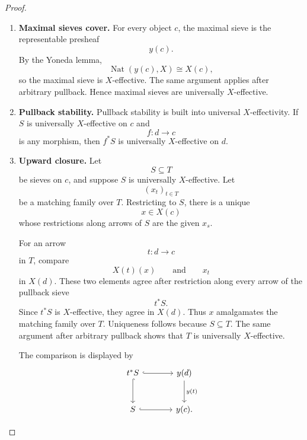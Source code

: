 \begin{proof}
    \leavevmode
    \begin{enumerate}
        \item \textbf{Maximal sieves cover.}
        For every object \(c\), the maximal sieve is the representable
        presheaf
        \[
            y(c).
        \]
        By the Yoneda lemma,
        \[
            \operatorname{Nat}(y(c),X)\cong X(c),
        \]
        so the maximal sieve is \(X\)-effective. The same argument applies
        after arbitrary pullback. Hence maximal sieves are universally
        \(X\)-effective.

        \item \textbf{Pullback stability.}
        Pullback stability is built into universal \(X\)-effectivity. If \(S\)
        is universally \(X\)-effective on \(c\) and
        \[
            f:d\to c
        \]
        is any morphism, then \(f^*S\) is universally \(X\)-effective on \(d\).

        \item \textbf{Upward closure.}
        Let
        \[
            S\subseteq T
        \]
        be sieves on \(c\), and suppose \(S\) is universally \(X\)-effective.
        Let
        \[
            (x_t)_{t\in T}
        \]
        be a matching family over \(T\). Restricting to \(S\), there is a
        unique
        \[
            x\in X(c)
        \]
        whose restrictions along arrows of \(S\) are the given \(x_s\).

        For an arrow
        \[
            t:d\to c
        \]
        in \(T\), compare
        \[
            X(t)(x)
            \qquad\text{and}\qquad
            x_t
        \]
        in \(X(d)\). These two elements agree after restriction along every
        arrow of the pullback sieve
        \[
            t^*S.
        \]
        Since \(t^*S\) is \(X\)-effective, they agree in \(X(d)\). Thus \(x\)
        amalgamates the matching family over \(T\). Uniqueness follows because
        \(S\subseteq T\). The same argument after arbitrary pullback shows that
        \(T\) is universally \(X\)-effective.

        The comparison is displayed by
        \[
        \begin{tikzcd}[column sep=large, row sep=large]
            t^*S
                \arrow[r, hook]
                \arrow[d, hook]
            &
            y(d)
                \arrow[d, "y(t)"]
            \\
            S
                \arrow[r, hook]
            &
            y(c).
        \end{tikzcd}
        \]


\end{enumerate}
\end{proof}
